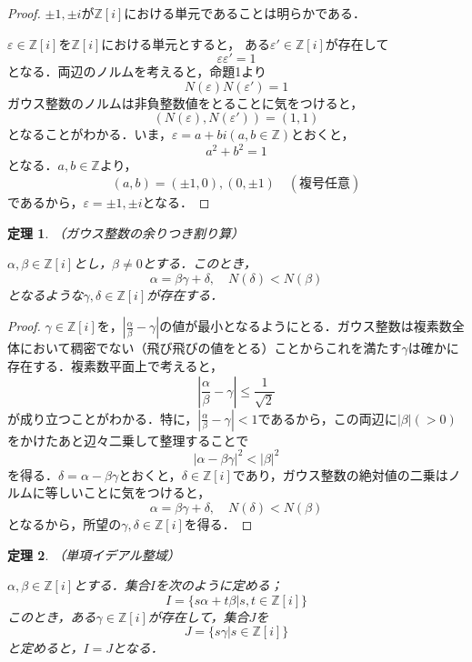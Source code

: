 \documentclass[dvipdfmx]{jsarticle}
\newtheorem{theorem}{定理}
\begin{document}
\begin{proof}
$\pm1,\pm i$が$\mathbb{Z}[i]$における単元であることは明らかである．

$\varepsilon\in\mathbb{Z}[i]$を$\mathbb{Z}[i]$における単元とすると，
ある$\varepsilon'\in\mathbb{Z}[i]$が存在して
$$\varepsilon\varepsilon'=1$$
となる．両辺のノルムを考えると，命題1より
$$N(\varepsilon)N(\varepsilon')=1$$
ガウス整数のノルムは非負整数値をとることに気をつけると，
$$(N(\varepsilon),N(\varepsilon'))=(1,1)$$
となることがわかる．いま，$\varepsilon=a+bi(a,b\in\mathbb{Z})$とおくと，
$$a^2+b^2=1$$
となる．$a,b\in\mathbb{Z}$より，
$$(a,b)=(\pm1,0),(0,\pm1)\quad(複号任意)$$
であるから，$\varepsilon=\pm1,\pm i$となる．
\end{proof}

\begin{theorem}{（ガウス整数の余りつき割り算）}

$\alpha,\beta\in\mathbb{Z}[i]$とし，$\beta\neq0$とする．このとき，
$$\alpha=\beta\gamma+\delta,\quad N(\delta)<N(\beta)$$
となるような$\gamma,\delta\in\mathbb{Z}[i]$が存在する．
\end{theorem}

\begin{proof}
$\gamma\in\mathbb{Z}[i]$を，$\left|\frac{\alpha}{\beta}-\gamma\right|$の値が最小となるようにとる．ガウス整数は複素数全体において稠密でない（飛び飛びの値をとる）ことからこれを満たす$\gamma$は確かに存在する．複素数平面上で考えると，
$$\left|\frac{\alpha}{\beta}-\gamma\right|\leq\frac{1}{\sqrt{2}}$$
が成り立つことがわかる．特に，$\left|\frac{\alpha}{\beta}-\gamma\right|<1$であるから，この両辺に$|\beta|(>0)$をかけたあと辺々二乗して整理することで
$$|\alpha-\beta\gamma|^2<|\beta|^2$$
を得る．$\delta=\alpha-\beta\gamma$とおくと，$\delta\in\mathbb{Z}[i]$であり，ガウス整数の絶対値の二乗はノルムに等しいことに気をつけると，
$$\alpha=\beta\gamma+\delta,\quad N(\delta)<N(\beta)$$
となるから，所望の$\gamma,\delta\in\mathbb{Z}[i]$を得る．
\end{proof}

\begin{theorem}{（単項イデアル整域）}

$\alpha,\beta\in\mathbb{Z}[i]$とする．集合$I$を次のように定める；
$$I=\{s\alpha+t\beta|s,t\in\mathbb{Z}[i]\}$$
このとき，ある$\gamma\in\mathbb{Z}[i]$が存在して，集合$J$を
$$J=\{s\gamma|s\in\mathbb{Z}[i]\}$$
と定めると，$I=J$となる．
\end{theorem}
\end{document}

